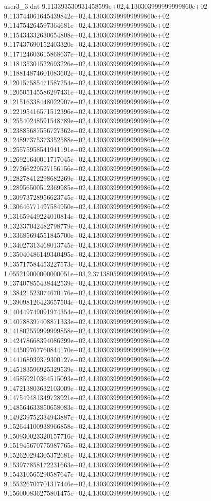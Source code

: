 \begin{filecontents}{user3_3.dat}
9.113393530931458599e+02,4.130303999999999860e+02
9.113744061645439842e+02,4.130303999999999860e+02
9.114754264597364681e+02,4.130303999999999860e+02
9.115434332630654808e+02,4.130303999999999860e+02
9.117437690152403320e+02,4.130303999999999860e+02
9.117124603615868637e+02,4.130303999999999860e+02
9.118135301522693226e+02,4.130303999999999860e+02
9.118814874601083602e+02,4.130303999999999860e+02
9.120157585471587254e+02,4.130303999999999860e+02
9.120505145586297431e+02,4.130303999999999860e+02
9.121516338448022907e+02,4.130303999999999860e+02
9.122195416571512396e+02,4.130303999999999860e+02
9.125540248591548789e+02,4.130303999999999860e+02
9.123885687556727362e+02,4.130303999999999860e+02
9.124897375373352588e+02,4.130303999999999860e+02
9.125575958541941191e+02,4.130303999999999860e+02
9.126921640011717045e+02,4.130303999999999860e+02
9.127266229527156156e+02,4.130303999999999860e+02
9.128278412298682269e+02,4.130303999999999860e+02
9.128956500512369985e+02,4.130303999999999860e+02
9.130973728956623745e+02,4.130303999999999860e+02
9.130646771497584950e+02,4.130303999999999860e+02
9.131659449224010814e+02,4.130303999999999860e+02
9.132337042482798779e+02,4.130303999999999860e+02
9.133685694551845700e+02,4.130303999999999860e+02
9.134027313468013745e+02,4.130303999999999860e+02
9.135040486149340495e+02,4.130303999999999860e+02
9.135717584453227573e+02,4.130303999999999860e+02
1.055219000000000051e+03,2.371380599999999959e+02
9.137407855438442539e+02,4.130303999999999860e+02
9.138421523074670176e+02,4.130303999999999860e+02
9.139098126423657504e+02,4.130303999999999860e+02
9.140449749091974354e+02,4.130303999999999860e+02
9.140788397408871333e+02,4.130303999999999860e+02
9.141802559999999858e+02,4.130303999999999860e+02
9.142478668394086299e+02,4.130303999999999860e+02
9.144509767760844170e+02,4.130303999999999860e+02
9.144168939379300127e+02,4.130303999999999860e+02
9.145183596925329539e+02,4.130303999999999860e+02
9.145859210364515093e+02,4.130303999999999860e+02
9.147213803632103009e+02,4.130303999999999860e+02
9.147549481349728921e+02,4.130303999999999860e+02
9.148564633850658083e+02,4.130303999999999860e+02
9.149239752334943887e+02,4.130303999999999860e+02
9.152644100938966858e+02,4.130303999999999860e+02
9.150930023320157716e+02,4.130303999999999860e+02
9.151945670775987765e+02,4.130303999999999860e+02
9.152620294305372681e+02,4.130303999999999860e+02
9.153977858172231663e+02,4.130303999999999860e+02
9.154310565290587647e+02,4.130303999999999860e+02
9.155326707701317446e+02,4.130303999999999860e+02
9.156000836275801475e+02,4.130303999999999860e+02

\end{filecontents}
